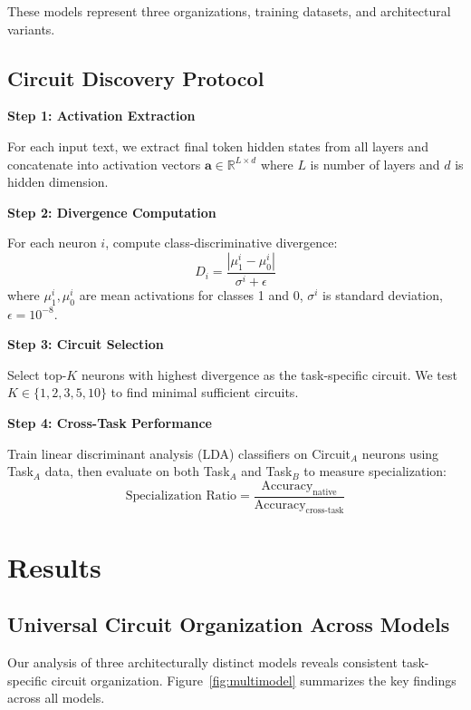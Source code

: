 \documentclass{article}
\begin{document}
These models represent three organizations, training datasets, and architectural variants.

\subsection{Circuit Discovery Protocol}

\textbf{Step 1: Activation Extraction}

For each input text, we extract final token hidden states from all layers and concatenate into activation vectors $\mathbf{a} \in \mathbb{R}^{L \times d}$ where $L$ is number of layers and $d$ is hidden dimension.

\textbf{Step 2: Divergence Computation}

For each neuron $i$, compute class-discriminative divergence:
\begin{equation}
D_i = \frac{|\mu_1^i - \mu_0^i|}{\sigma^i + \epsilon}
\end{equation}
where $\mu_1^i, \mu_0^i$ are mean activations for classes 1 and 0, $\sigma^i$ is standard deviation, $\epsilon = 10^{-8}$.

\textbf{Step 3: Circuit Selection}

Select top-$K$ neurons with highest divergence as the task-specific circuit. We test $K \in \{1, 2, 3, 5, 10\}$ to find minimal sufficient circuits.

\textbf{Step 4: Cross-Task Performance}

Train linear discriminant analysis (LDA) classifiers on Circuit$_A$ neurons using Task$_A$ data, then evaluate on both Task$_A$ and Task$_B$ to measure specialization:
\begin{equation}
\text{Specialization Ratio} = \frac{\text{Accuracy}_{\text{native}}}{\text{Accuracy}_{\text{cross-task}}}
\end{equation}

\section{Results}

\subsection{Universal Circuit Organization Across Models}

Our analysis of three architecturally distinct models reveals consistent task-specific circuit organization. Figure~\ref{fig:multimodel} summarizes the key findings across all models.
\end{document}
